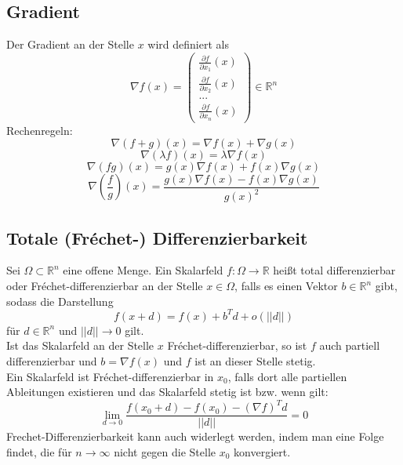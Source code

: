 \documentclass[a4paper,twocolumn,10pt]{article}
\begin{document}
\subsection{Gradient}
Der Gradient an der Stelle $x$ wird definiert als
\begin{equation*}
\nabla f(x)=\begin{pmatrix}\frac{\partial f}{\partial x_1}(x) \\ \frac{\partial f}{\partial x_2}(x) \\ ... \\ \frac{\partial f}{\partial x_n}(x)\end{pmatrix}\in\mathbb{R}^n
\end{equation*}
Rechenregeln:
\begin{equation*}
\nabla (f+g)(x)=\nabla f(x)+\nabla g(x)
\end{equation*}
\begin{equation*}
\nabla (\lambda f)(x)=\lambda\nabla f(x)
\end{equation*}
\begin{equation*}
\nabla(fg)(x)=g(x)\nabla f(x)+f(x)\nabla g(x)
\end{equation*}
\begin{equation*}
\nabla \left(\frac{f}{g}\right)(x)=\frac{g(x)\nabla f(x)-f(x)\nabla g(x)}{g(x)^2}
\end{equation*}

\subsection{Totale (Fréchet-) Differenzierbarkeit}
Sei $\Omega\subset\mathbb{R}^n$ eine offene Menge. Ein Skalarfeld $f:\Omega\rightarrow\mathbb{R}$ heißt total differenzierbar oder Fréchet-differenzierbar an der Stelle $x\in\Omega$, falls es einen Vektor $b\in\mathbb{R}^n$ gibt, sodass die Darstellung
\begin{equation*}
f(x+d)=f(x)+b^Td+o(||d||)
\end{equation*}
für $d\in\mathbb{R}^n$ und $||d||\rightarrow 0$ gilt.\\
Ist das Skalarfeld an der Stelle $x$ Fréchet-differenzierbar, so ist $f$ auch partiell differenzierbar und $b=\nabla f(x)$ und $f$ ist an dieser Stelle stetig.\\
Ein Skalarfeld ist Fréchet-differenzierbar in $x_0$, falls dort alle partiellen Ableitungen existieren und das Skalarfeld stetig ist bzw. wenn gilt:
\begin{equation*}
\lim\limits_{d\rightarrow 0}\frac{f(x_0+d)-f(x_0)-(\nabla f)^T d}{||d||}=0
\end{equation*}
Frechet-Differenzierbarkeit kann auch widerlegt werden, indem man eine Folge findet, die für $n\rightarrow\infty$ nicht gegen die Stelle $x_0$ konvergiert.
\end{document}
